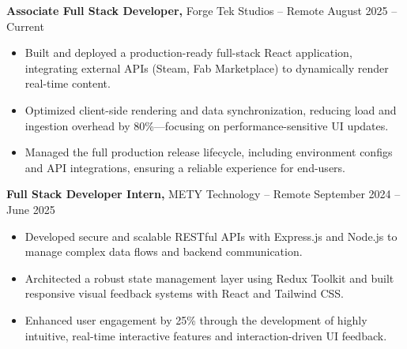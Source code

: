 \documentclass[11pt]{article}       %
\begin{document}
\textbf{Associate Full Stack Developer,} {Forge Tek Studios} -- Remote \hfill August 2025 -- Current 
\vspace{-9pt}
\begin{itemize}
  \item Built and deployed a production-ready full-stack React application, integrating external APIs (Steam, Fab Marketplace) to dynamically render real-time content.
  \item Optimized client-side rendering and data synchronization, reducing load and ingestion overhead by 80\%—focusing on performance-sensitive UI updates.
  \item Managed the full production release lifecycle, including environment configs and API integrations, ensuring a reliable experience for end-users.
\end{itemize}

\textbf{Full Stack Developer Intern,} {METY Technology} -- Remote \hfill September 2024 -- June 2025 
\vspace{-9pt}
\begin{itemize}
  \item Developed secure and scalable RESTful APIs with Express.js and Node.js to manage complex data flows and backend communication.
  \item Architected a robust state management layer using Redux Toolkit and built responsive visual feedback systems with React and Tailwind CSS.
  \item Enhanced user engagement by 25\% through the development of highly intuitive, real-time interactive features and interaction-driven UI feedback.
\end{itemize}

\end{document}
